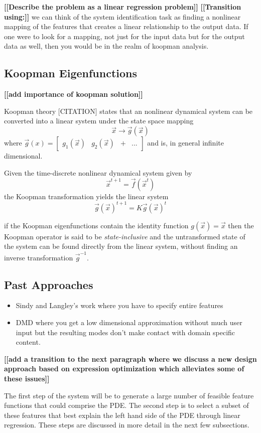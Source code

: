 \documentclass{article}
\newcommand{\todo}[1]{\textbf{[[#1]]}}
\begin{document}
\todo{Describe the problem as a linear regression problem}
\todo{Transition using:}
we can think of the system identification task as finding a nonlinear mapping of the features that creates a linear relationship to the output data. If one were to look for a mapping, not just for the input data but for the output data as well, then you would be in the realm of koopman analysis.

\subsection{Koopman Eigenfunctions}
\todo{add importance of koopman solution} 

Koopman theory [CITATION] states that an nonlinear dynamical system can be converted into a linear system under the state space mapping
\[ \vec{x} \rightarrow \vec{g}(\vec{x}) \]
where $\vec{g}(x) = \begin{bmatrix} g_1(\vec{x}) & g_2(\vec{x}) & + & ... \end{bmatrix}$ and is, in general infinite dimensional.

Given the time-discrete nonlinear dynamical system given by
\[ \vec{x}^{t+1} = \vec{f}(\vec{x}^t)\]
the Koopman transformation yields the linear system
\[ \vec{g}(\vec{x})^{t+1} = K \vec{g}(\vec{x})^{t} \]

if the Koopman eigenfunctions contain the identity function $g(\vec{x}) = \vec{x}$ then the Koopman operator is said to be \emph{state-inclusive} and the untransformed state of the system can be found directly from the linear system, without finding an inverse transformation $\vec{g}^{-1}$.


\subsection{Past Approaches}
\begin{itemize}
    \item Sindy and Langley's work where you have to specify entire features
    \item DMD where you get a low dimensional approximation without much user input but the resulting modes don't make contact with domain specific content.
\end{itemize}


\todo{add a transition to the next paragraph where we discuss a new design approach based on expression optimization which alleviates some of these issues}

The first step of the system will be to generate a large number of feasible feature functions that could comprise the PDE. The second step is to select a subset of these features that best explain the left hand side of the PDE through linear regression. These steps are discussed in more detail in the next few subsections.
\end{document}
